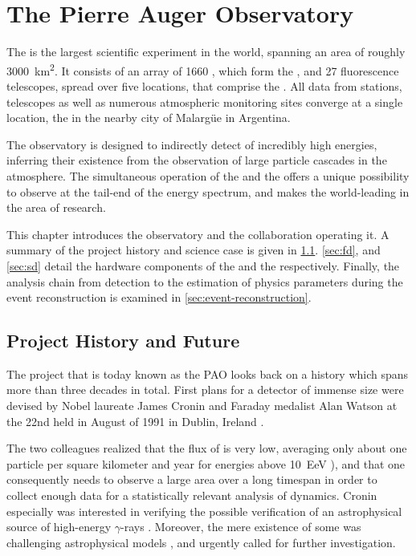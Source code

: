
\chapter{The Pierre Auger Observatory}
\label{chap:pierre-auger-observatory}

The \PAO is the largest scientific experiment in the world, spanning an area of
roughly \SI{3000}{\kilo\meter\squared}. It consists of an array of 1660 \WCDs, 
which form the \SD, and 27 fluorescence telescopes, spread over five locations,
that comprise the \FD. All data from \SD stations, \FD telescopes as well as 
numerous atmospheric monitoring sites converge at a single location, the \CDAS
in the nearby city of Malargüe in Argentina. 

The observatory is designed to indirectly detect \CRs of incredibly high 
energies, inferring their existence from the observation of large particle 
cascades in the atmosphere. The simultaneous operation of the \FD and the \SD 
offers a unique possibility to observe \UHECRs at the tail-end of the \CR 
energy spectrum, and makes the \PAO world-leading in the area of \UHECR 
research.

This chapter introduces the observatory and the collaboration operating it. A 
summary of the project history and science case is given in 
\cref{sec:project-history-and-future}. \cref{sec:fd}, and \cref{sec:sd} detail 
the hardware components of the \FD and the \SD respectively. Finally, 
the analysis chain from \EAS detection to the estimation of physics parameters 
during the event reconstruction is examined in \cref{sec:event-reconstruction}.

\section{Project History and Future}
\label{sec:project-history-and-future}

The project that is today known as the \acl{PAO} looks back on a history which 
spans more than three decades in total. First plans for a \CR detector of
immense size were devised by Nobel laureate James Cronin 
\cite{nobelprizeoutreach2025NobelPrizePhysics} and Faraday medalist Alan Watson
\cite{FellowWinsIoP2011} at the 22nd \ICRC held in August of 1991 in Dublin,
Ireland \cite{watsonDevelopmentPierreAuger}.

The two colleagues realized that the flux of \UHECRs is very low, averaging
only about one particle per square kilometer and year for energies above 
\SI{10}{\exa\eV} \cite{fenuCosmicRayEnergy2023}), and that one consequently 
needs to observe a large area over a long timespan in order to collect enough 
data for a statistically relevant analysis of \UHECR dynamics. Cronin 
especially was interested in verifying the possible verification of an 
astrophysical source of high-energy $\gamma$-rays 
\cite{samorskiDetection2101983}. Moreover, the mere existence of some \UHECRs 
was challenging astrophysical models 
\cite{birdDetectionCosmicRay1995, naganoAstrophysicalAspectsMost1991, 
hayashidaObservationVeryEnergetic1994, lawrenceCosmicRayEnergy1991}, and 
urgently called for further investigation. 

